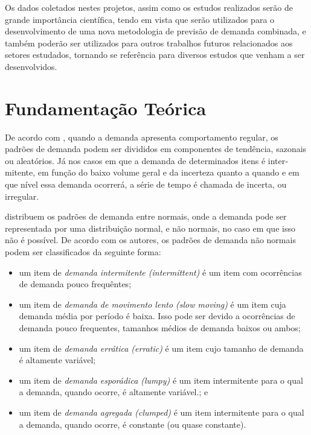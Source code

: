 \documentclass[11pt,letterpaper,twocolumn]{article}
\begin{document}
Os dados coletados nestes projetos, assim como os estudos realizados serão de grande importância científica, tendo em vista que serão utilizados para o desenvolvimento de uma nova metodologia de previsão de demanda combinada, e também poderão ser utilizados para outros trabalhos futuros relacionados aos setores estudados, tornando se referência para diversos estudos que venham a ser desenvolvidos.

\section{Fundamentação Teórica}


De acordo com \cite{Ballou2006}, quando a demanda apresenta comportamento regular, os padrões de demanda podem ser divididos em compo­nentes de tendência, sazonais ou aleatórios. Já nos casos em que a demanda de determinados itens é inter­mitente, em função do baixo volume geral e da incerte­za quanto a quando e em que nível essa demanda ocor­rerá, a série de tempo é chamada de incerta, ou irregu­lar.

\cite{BoylanEtAl2008} distribuem os padrões de demanda entre normais, onde a demanda pode ser representada por uma distribuição normal, e não normais, no caso em que isso não é possível. De acordo com os autores, os padrões de demanda não normais podem ser classificados da seguinte forma:

\begin{itemize}
  \item um item de \emph{demanda intermitente (intermittent)} é um item com ocorrências de demanda pouco frequêntes;
  \item um item de \emph{demanda de movimento lento (slow moving)} é um item cuja demanda média por período é baixa. Isso pode ser devido a ocorrências de demanda pouco frequentes, tamanhos médios de demanda baixos ou ambos;
  \item um item de \emph{demanda errática (erratic)} é um item cujo tamanho de demanda é altamente variável;
  \item um item de \emph{demanda esporádica (lumpy)} é um item intermitente para o qual a demanda, quando ocorre, é altamente variável.; e
  \item um item de \emph{demanda agregada (clumped)} é um item intermitente para o qual a demanda, quando ocorre, é constante (ou quase constante).
\end{itemize}
\end{document}

